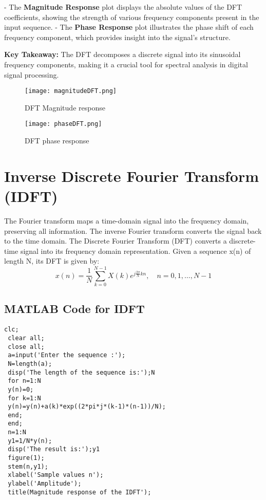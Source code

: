 \documentclass[a4paper,12pt]{article}
\begin{document}
- The \textbf{Magnitude Response} plot displays the absolute values of the DFT coefficients, showing the strength of various frequency components present in the input sequence.
- The \textbf{Phase Response} plot illustrates the phase shift of each frequency component, which provides insight into the signal's structure.

\textbf{Key Takeaway:} The DFT decomposes a discrete signal into its sinusoidal frequency components, making it a crucial tool for spectral analysis in digital signal processing.
\begin{figure}[h]
    \centering
    \texttt{[image: magnitudeDFT.png]}
    \caption{DFT Magnitude response}
    \label{fig:dft_result}
\end{figure}
\begin{figure}[h]
    \centering
    \texttt{[image: phaseDFT.png]}
    \caption{DFT phase response}
    \label{fig:dft_result}
\end{figure}
\section{ Inverse Discrete Fourier Transform (IDFT)}
 The Fourier transform maps a time-domain signal into the frequency domain,
 preserving all information. The inverse Fourier transform converts the signal
 back to the time domain. The Discrete Fourier Transform (DFT) converts a
 discrete-time signal into its frequency domain representation. Given a sequence x(n) of length N, its DFT is given by:
 \begin{equation}
    x(n) = \frac{1}{N} \sum_{k=0}^{N-1} X(k) e^{j \frac{2\pi}{N} kn}, \quad n = 0,1,\dots,N-1
\end{equation}
\subsection{MATLAB Code  for IDFT}
\begin{verbatim} 
clc;
 clear all;
 close all;
 a=input('Enter the sequence :');
 N=length(a);
 disp('The length of the sequence is:');N
 for n=1:N
 y(n)=0;
 for k=1:N
 y(n)=y(n)+a(k)*exp((2*pi*j*(k-1)*(n-1))/N);
 end;
 end;
 n=1:N
 y1=1/N*y(n);
 disp('The result is:');y1
 figure(1);
 stem(n,y1);
 xlabel('Sample values n');
 ylabel('Amplitude');
 title(Magnitude response of the IDFT');
\end{verbatim}
\end{document}
